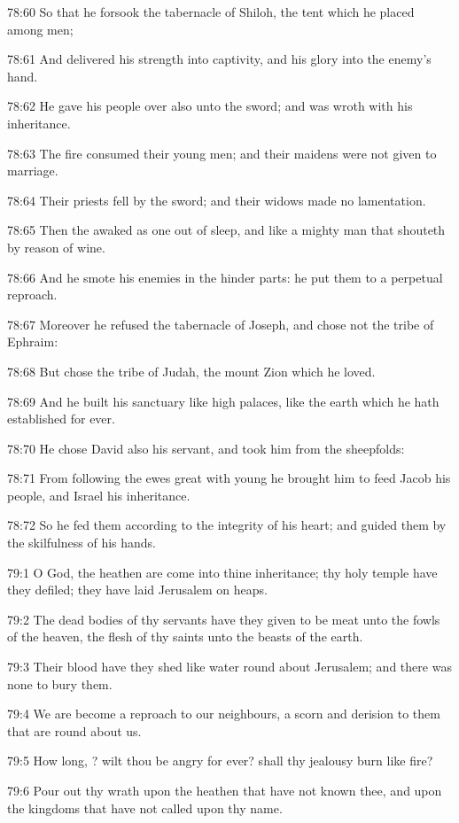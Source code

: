 78:60 So that he forsook the tabernacle of Shiloh, the tent which he placed among men;

78:61 And delivered his strength into captivity, and his glory into the enemy's hand.

78:62 He gave his people over also unto the sword; and was wroth with his inheritance.

78:63 The fire consumed their young men; and their maidens were not given to marriage.

78:64 Their priests fell by the sword; and their widows made no lamentation.

78:65 Then the \LORD awaked as one out of sleep, and like a mighty man that shouteth by reason of wine.

78:66 And he smote his enemies in the hinder parts: he put them to a perpetual reproach.

78:67 Moreover he refused the tabernacle of Joseph, and chose not the tribe of Ephraim:

78:68 But chose the tribe of Judah, the mount Zion which he loved.

78:69 And he built his sanctuary like high palaces, like the earth which he hath established for ever.

78:70 He chose David also his servant, and took him from the sheepfolds:

78:71 From following the ewes great with young he brought him to feed Jacob his people, and Israel his inheritance.

78:72 So he fed them according to the integrity of his heart; and guided them by the skilfulness of his hands.



79:1 O God, the heathen are come into thine inheritance; thy holy temple have they defiled; they have laid Jerusalem on heaps.

79:2 The dead bodies of thy servants have they given to be meat unto the fowls of the heaven, the flesh of thy saints unto the beasts of the earth.

79:3 Their blood have they shed like water round about Jerusalem; and there was none to bury them.

79:4 We are become a reproach to our neighbours, a scorn and derision to them that are round about us.

79:5 How long, \LORD? wilt thou be angry for ever? shall thy jealousy burn like fire?

79:6 Pour out thy wrath upon the heathen that have not known thee, and upon the kingdoms that have not called upon thy name.

